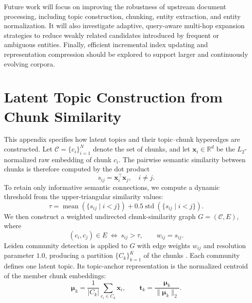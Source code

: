 \documentclass[a4paper,fleqn]{cas-dc}
\begin{document}
Future work will focus on improving the robustness of upstream document processing, including topic construction, chunking, entity extraction, and entity normalization. It will also investigate adaptive, query-aware multi-hop expansion strategies to reduce weakly related candidates introduced by frequent or ambiguous entities. Finally, efficient incremental index updating and representation compression should be explored to support larger and continuously evolving corpora.
\printcredits

\appendix
{}
\section{Latent Topic Construction from Chunk Similarity}
\label{app:latent_topic_construction}

This appendix specifies how latent topics and their topic--chunk hyperedges are constructed. Let $\mathcal{C}=\{c_i\}_{i=1}^{N}$ denote the set of chunks, and let $\mathbf{x}_i\in\mathbb{R}^{d}$ be the $L_2$-normalized raw embedding of chunk $c_i$. The pairwise semantic similarity between chunks is therefore computed by the dot product
\begin{equation}
s_{ij}=\mathbf{x}_i^{\top}\mathbf{x}_j,
\quad i\neq j.
\end{equation}
To retain only informative semantic connections, we compute a dynamic threshold from the upper-triangular similarity values:
\begin{equation}
\tau=\operatorname{mean}\left(\{s_{ij}\mid i<j\}\right)
+0.5\operatorname{std}\left(\{s_{ij}\mid i<j\}\right).
\end{equation}
We then construct a weighted undirected chunk-similarity graph $G=(\mathcal{C},E)$, where
\begin{equation}
(c_i,c_j)\in E\ \Longleftrightarrow\ s_{ij}>\tau,
\qquad w_{ij}=s_{ij}.
\end{equation}
Leiden community detection is applied to $G$ with edge weights $w_{ij}$ and resolution parameter $1.0$, producing a partition $\{C_k\}_{k=1}^{K}$ of the chunks \citep{Traag2019Leiden}. Each community defines one latent topic. Its topic-anchor representation is the normalized centroid of the member chunk embeddings:
\begin{equation}
\boldsymbol{\mu}_k=\frac{1}{|C_k|}\sum_{c_i\in C_k}\mathbf{x}_i,
\qquad
\mathbf{t}_k=\frac{\boldsymbol{\mu}_k}{\|\boldsymbol{\mu}_k\|_2}.
\end{equation}
\end{document}
